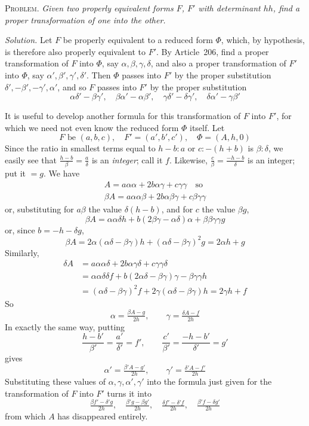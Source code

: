 \textsc{Problem.} \textit{Given two properly equivalent forms $F$, $F'$ with determinant $hh$, find a proper transformation of one into the other.}

\textit{Solution.} Let $F$ be properly equivalent to a reduced form $\Phi$, which, by hypothesis, is therefore also properly equivalent to $F'$. By Article~206, find a proper transformation of $F$ into $\Phi$, say $\alpha,\beta,\gamma,\delta$, and also a proper transformation of $F'$ into $\Phi$, say $\alpha',\beta',\gamma',\delta'$. Then $\Phi$ passes into $F'$ by the proper substitution $\delta',-\beta',-\gamma',\alpha'$, and so $F$ passes into $F'$ by the proper substitution
\[
\alpha\delta'-\beta\gamma',\quad\beta\alpha'-\alpha\beta',\quad
\gamma\delta'-\delta\gamma',\quad\delta\alpha'-\gamma\beta'
\]

It is useful to develop another formula for this transformation of $F$ into $F'$, for which we need not even know the reduced form $\Phi$ itself. Let
\[
F\text{ be }(a,b,c),\quad F'=(a',b',c'),\quad\Phi=(A,h,0)
\]
Since the ratio in smallest terms equal to $h-b:a$ or $c:-(h+b)$ is $\beta:\delta$, we easily see that $\frac{h-b}{\beta}=\frac a\delta$ is an \textit{integer}; call it $f$. Likewise, $\frac c\beta=\frac{-h-b}{\delta}$ is an integer; put it $=g$. We have
\[
\begin{gathered}A=a\alpha\alpha+2b\alpha\gamma+c\gamma\gamma\quad\text{so}\\
\beta A=a\alpha\alpha\beta+2b\alpha\beta\gamma+c\beta\gamma\gamma\end{gathered}
\]
or, substituting for $a\beta$ the value $\delta(h-b)$, and for $c$ the value $\beta g$,
\[
\beta A=\alpha\alpha\delta h+b(2\beta\gamma-\alpha\delta)\alpha+\beta\beta\gamma\gamma g
\]
or, since $b=-h-\delta g$,
\[
\beta A=2\alpha(\alpha\delta-\beta\gamma)h+(\alpha\delta-\beta\gamma)^2g=2\alpha h+g
\]
Similarly,
\[
\begin{aligned}
\delta A&=a\alpha\alpha\delta+2b\alpha\gamma\delta+c\gamma\gamma\delta\\
&=\alpha\alpha\delta\delta f+b(2\alpha\delta-\beta\gamma)\gamma-\beta\gamma\gamma h\\
&=(\alpha\delta-\beta\gamma)^2f+2\gamma(\alpha\delta-\beta\gamma)h=2\gamma h+f
\end{aligned}
\]
So
\[
\alpha=\tfrac{\beta A-g}{2h},\qquad\gamma=\tfrac{\delta A-f}{2h}
\]
In exactly the same way, putting
\[
\frac{h-b'}{\beta'}=\frac{a'}{\delta'}=f',\qquad
\frac{c'}{\beta'}=\frac{-h-b'}{\delta'}=g'
\]
gives
\[
\alpha'=\tfrac{\beta' A-g'}{2h},\qquad\gamma'=\tfrac{\delta' A-f'}{2h}
\]
Substituting these values of $\alpha,\gamma,\alpha',\gamma'$ into the formula just given for the transformation of $F$ into $F'$ turns it into
\[
\tfrac{\beta f'-\delta'g}{2h},\quad
\tfrac{\beta'g-\beta g'}{2h},\quad
\tfrac{\delta f'-\delta'f}{2h},\quad
\tfrac{\beta'f-\delta g'}{2h}
\]
from which $A$ has disappeared entirely.

